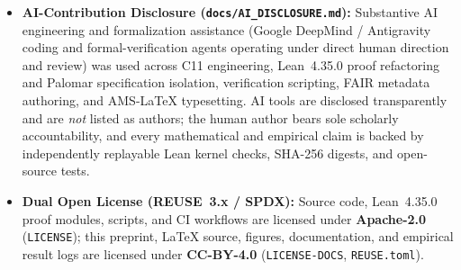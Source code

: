 \documentclass[11pt,reqno]{amsart}
\theoremstyle{plain}
\theoremstyle{definition}
\theoremstyle{remark}
\newcommand{\code}[1]{{\footnotesize\nolinkurl{#1}}}
\begin{document}
\begin{itemize}[leftmargin=1.6em, itemsep=2pt]
  \item \textbf{AI-Contribution Disclosure (\code{docs/AI_DISCLOSURE.md}):} Substantive AI engineering and formalization assistance (Google DeepMind / Antigravity coding and formal-verification agents operating under direct human direction and review) was used across C11 engineering, Lean~4.35.0 proof refactoring and Palomar specification isolation, verification scripting, FAIR metadata authoring, and AMS-LaTeX typesetting. AI tools are disclosed transparently and are \emph{not} listed as authors; the human author bears sole scholarly accountability, and every mathematical and empirical claim is backed by independently replayable Lean kernel checks, SHA-256 digests, and open-source tests.
  \item \textbf{Dual Open License (REUSE~3.x / SPDX):} Source code, Lean~4.35.0 proof modules, scripts, and CI workflows are licensed under \textbf{Apache-2.0} (\code{LICENSE}); this preprint, LaTeX source, figures, documentation, and empirical result logs are licensed under \textbf{CC-BY-4.0} (\code{LICENSE-DOCS}, \code{REUSE.toml}).
\end{itemize}

\FloatBarrier


\end{document}
